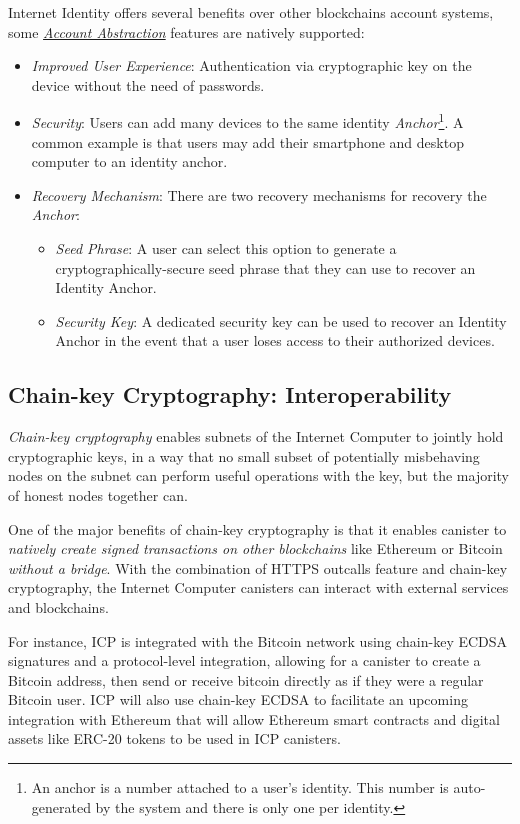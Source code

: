 Internet Identity offers several benefits over other blockchains account systems, some \hyperref[sec:account_abstraction]{\textit{Account Abstraction}} features are natively supported: \cite{icp-identity-technical}
\begin{itemize}
    \item \textit{Improved User Experience}: Authentication via cryptographic key on the device without the need of passwords.
    \item \textit{Security}: Users can add many devices to the same identity \textit{Anchor}\footnote{An anchor is a number attached to a user's identity. This number is auto-generated by the system and there is only one per identity.}. A common example is that users may add their smartphone and desktop computer to an identity anchor. 
    \item \textit{Recovery Mechanism}: There are two recovery mechanisms for recovery the \textit{Anchor}:
        \begin{itemize}
            \item \textit{Seed Phrase}: A user can select this option to generate a cryptographically-secure seed phrase that they can use to recover an Identity Anchor. 
            \item \textit{Security Key}: A dedicated security key can be used to recover an Identity Anchor in the event that a user loses access to their authorized devices. 
        \end{itemize}
\end{itemize}

\subsection{Chain-key Cryptography: Interoperability}

\textit{Chain-key cryptography} enables subnets of the Internet Computer to jointly hold cryptographic keys, in a way that no small subset of potentially misbehaving nodes on the subnet can perform useful operations with the key, but the majority of honest nodes together can. \cite{icp-chain-key}

One of the major benefits of chain-key cryptography is that it enables canister to \textit{natively create signed transactions on other blockchains} like Ethereum or Bitcoin \textit{without a bridge}. \cite{icp-cross-chain-interoperability} With the combination of HTTPS outcalls feature and chain-key cryptography, the Internet Computer canisters can interact with external services and blockchains. \cite{icp-https-outcalls}

For instance, ICP is integrated with the Bitcoin network using chain-key ECDSA signatures and a protocol-level integration, allowing for a canister to create a Bitcoin address, then send or receive bitcoin directly as if they were a regular Bitcoin user. ICP will also use chain-key ECDSA to facilitate an upcoming integration with Ethereum that will allow Ethereum smart contracts and digital assets like ERC-20 tokens to be used in ICP canisters. \cite{icp-cross-chain-interoperability}


